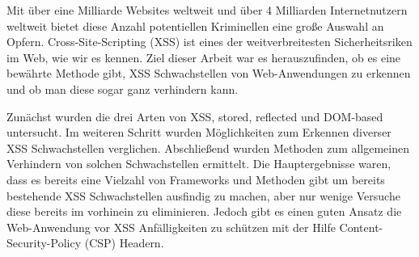 Mit über eine Milliarde Websites weltweit und über 4 Milliarden Internetnutzern weltweit bietet diese Anzahl potentiellen Kriminellen eine große Auswahl an Opfern. Cross-Site-Scripting (XSS) ist eines der weitverbreitesten Sicherheitsriken im Web, wie wir es kennen. Ziel dieser Arbeit war es herauszufinden, ob es eine bewährte Methode gibt, XSS Schwachstellen von Web-Anwendungen zu erkennen und ob man diese sogar ganz verhindern kann.

Zunächst wurden die drei Arten von XSS, stored, reflected und DOM-based untersucht. Im weiteren Schritt wurden Möglichkeiten zum Erkennen diverser XSS Schwachstellen verglichen. Abschließend wurden Methoden zum allgemeinen Verhindern von solchen Schwachstellen ermittelt. Die Hauptergebnisse waren, dass es bereits eine Vielzahl von Frameworks und Methoden gibt um bereits bestehende XSS Schwachstellen ausfindig zu machen, aber nur wenige Versuche diese bereits im vorhinein zu eliminieren. Jedoch gibt es einen guten Ansatz die Web-Anwendung vor XSS Anfälligkeiten zu schützen mit der Hilfe Content-Security-Policy (CSP) Headern.